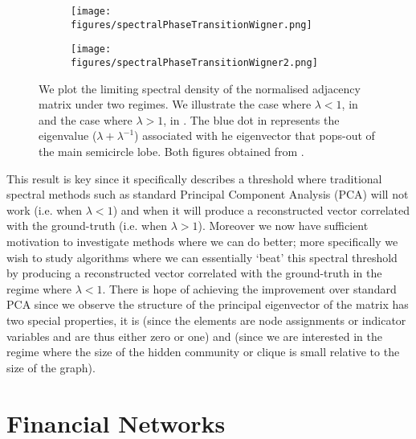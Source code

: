 \begin{figure}
	\centering
	\begin{subfigure}{.5\textwidth}
		\centering
		\texttt{[image: figures/spectralPhaseTransitionWigner.png]}
		\caption{}
		\label{fig:spectralPhaseTransitionWigner}
	\end{subfigure}%
	\begin{subfigure}{.5\textwidth}
		\centering
		\texttt{[image: figures/spectralPhaseTransitionWigner2.png]}
		\caption{}
		\label{fig:spectralPhaseTransitionWigner2}
	\end{subfigure}
	\caption[Plots illustrating spectral phase transition of Wigner Matrices]{\label{fig:spectralPhaseTransitionWignerPlots} We plot the limiting spectral density of the normalised adjacency matrix under two regimes. We illustrate the case where $\lambda < 1$, in  and the case where $\lambda > 1$, in . The blue dot in  represents the eigenvalue ($\lambda + \lambda^{-1}$) associated with he eigenvector that pops-out of the main semicircle lobe. Both figures obtained from \cite{Mon13}.}
\end{figure}

This result is key since it specifically describes a threshold where traditional spectral methods such as standard Principal Component Analysis (PCA) will not work (i.e. when $\lambda < 1$) and when it will produce a reconstructed vector correlated with the ground-truth (i.e. when $\lambda > 1$).
Moreover we now have sufficient motivation to investigate methods where we can do better; more specifically we wish to study algorithms where we can essentially `beat' this spectral threshold by producing a reconstructed vector correlated with the ground-truth in the regime where $\lambda < 1$.
There is hope of achieving the improvement over standard PCA since we observe the structure of the principal eigenvector of the matrix has two special properties, it is  (since the elements are node assignments or indicator variables and are thus either zero or one) and  (since we are interested in the regime where the size of the hidden community or clique is small relative to the size of the graph).


\section{Financial Networks}
\label{sec:financialNetworksBackground}

